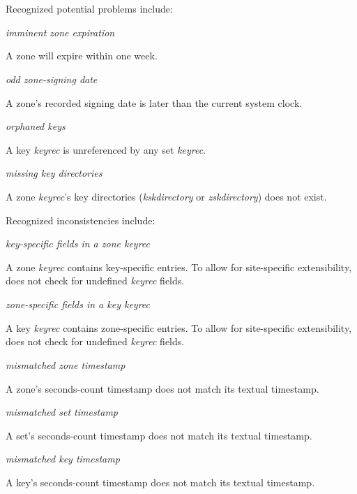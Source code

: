 Recognized potential problems include:

\begin{description}

\item {\it imminent zone expiration}\verb" "

A zone will expire within one week. 

\item {\it odd zone-signing date}\verb" "

A zone's recorded signing date is later than the current system clock.

\item {\it orphaned keys}\verb" "

A key {\it keyrec} is unreferenced by any set {\it keyrec}.

\item {\it missing key directories}\verb" "

A zone {\it keyrec}'s key directories ({\it kskdirectory} or {\it zskdirectory}) does
not exist.

\end{description}

Recognized inconsistencies include:

\begin{description}

\item {\it key-specific fields in a zone {\it keyrec}}\verb" "

A zone {\it keyrec} contains key-specific entries.  To allow for site-specific
extensibility,  does not check for undefined {\it keyrec} fields.

\item {\it zone-specific fields in a key {\it keyrec}}\verb" "

A key {\it keyrec} contains zone-specific entries.  To allow for site-specific
extensibility,  does not check for undefined {\it keyrec} fields.

\item {\it mismatched zone timestamp}\verb" "

A zone's seconds-count timestamp does not match its textual timestamp.

\item {\it mismatched set timestamp}\verb" "

A set's seconds-count timestamp does not match its textual timestamp.

\item {\it mismatched key timestamp}\verb" "

A key's seconds-count timestamp does not match its textual timestamp.

\end{description}

